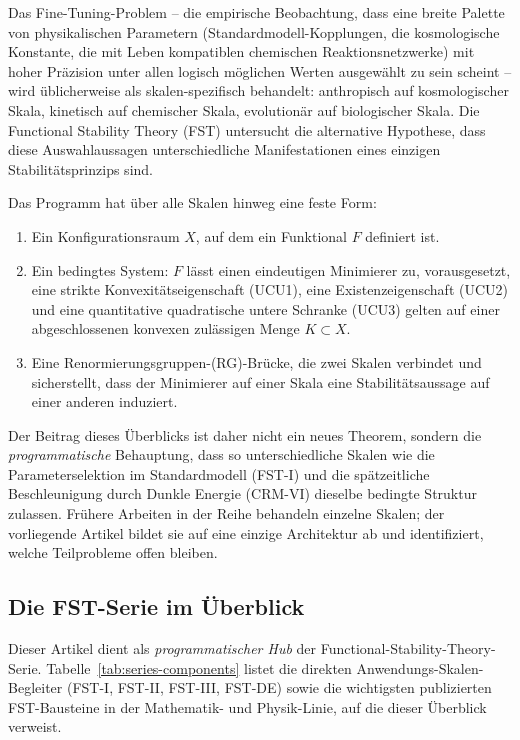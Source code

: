 \documentclass[11pt,a4paper]{article}
\theoremstyle{remark}
\begin{document}
Das Fine-Tuning-Problem -- die empirische Beobachtung, dass eine breite Palette von physikalischen Parametern (Standardmodell-Kopplungen, die kosmologische Konstante, die mit Leben kompatiblen chemischen Reaktionsnetzwerke) mit hoher Präzision unter allen logisch möglichen Werten ausgewählt zu sein scheint -- wird üblicherweise als skalen-spezifisch behandelt: anthropisch auf kosmologischer Skala, kinetisch auf chemischer Skala, evolutionär auf biologischer Skala. Die Functional Stability Theory (FST) untersucht die alternative Hypothese, dass diese Auswahlaussagen unterschiedliche Manifestationen eines einzigen Stabilitätsprinzips sind.

Das Programm hat über alle Skalen hinweg eine feste Form:
\begin{enumerate}[label=(\roman*),leftmargin=2em]
\item Ein Konfigurationsraum $X$, auf dem ein Funktional $F$ definiert ist.
\item Ein bedingtes System: $F$ lässt einen eindeutigen Minimierer zu, vorausgesetzt, eine strikte Konvexitätseigenschaft (UCU1), eine Existenzeigenschaft (UCU2) und eine quantitative quadratische untere Schranke (UCU3) gelten auf einer abgeschlossenen konvexen zulässigen Menge $K \subset X$.
\item Eine Renormierungsgruppen-(RG)-Brücke, die zwei Skalen verbindet und sicherstellt, dass der Minimierer auf einer Skala eine Stabilitätsaussage auf einer anderen induziert.
\end{enumerate}
Der Beitrag dieses Überblicks ist daher nicht ein neues Theorem, sondern die \emph{programmatische} Behauptung, dass so unterschiedliche Skalen wie die Parameterselektion im Standardmodell (FST-I) und die spätzeitliche Beschleunigung durch Dunkle Energie (CRM-VI) dieselbe bedingte Struktur zulassen. Frühere Arbeiten in der Reihe behandeln einzelne Skalen; der vorliegende Artikel bildet sie auf eine einzige Architektur ab und identifiziert, welche Teilprobleme offen bleiben.

\subsection*{Die FST-Serie im Überblick}
\label{subsec:series-glance-de}

Dieser Artikel dient als \emph{programmatischer Hub} der Functional-Stability-Theory-Serie. Tabelle~\ref{tab:series-components} listet die direkten Anwendungs-Skalen-Begleiter (FST-I, FST-II, FST-III, FST-DE) sowie die wichtigsten publizierten FST-Bausteine in der Mathematik- und Physik-Linie, auf die dieser Überblick verweist.
\end{document}

